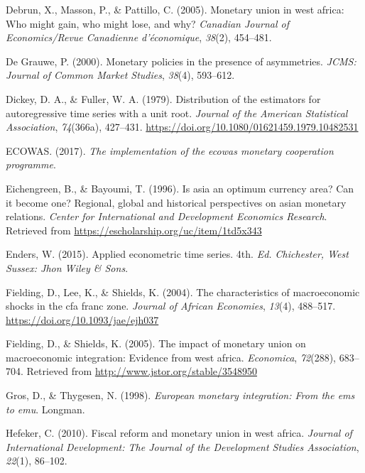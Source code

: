 \documentclass[]{article}
\begin{document}
\leavevmode\hypertarget{ref-debrun2005monetary}{}%
Debrun, X., Masson, P., \& Pattillo, C. (2005). Monetary union in west africa: Who might gain, who might lose, and why? \emph{Canadian Journal of Economics/Revue Canadienne d'économique}, \emph{38}(2), 454--481.

\leavevmode\hypertarget{ref-de2000monetary}{}%
De Grauwe, P. (2000). Monetary policies in the presence of asymmetries. \emph{JCMS: Journal of Common Market Studies}, \emph{38}(4), 593--612.

\leavevmode\hypertarget{ref-Dickey1979}{}%
Dickey, D. A., \& Fuller, W. A. (1979). Distribution of the estimators for autoregressive time series with a unit root. \emph{Journal of the American Statistical Association}, \emph{74}(366a), 427--431. \url{https://doi.org/10.1080/01621459.1979.10482531}

\leavevmode\hypertarget{ref-ECOWAS2017}{}%
ECOWAS. (2017). \emph{The implementation of the ecowas monetary cooperation programme}.

\leavevmode\hypertarget{ref-eichengreen1996asia}{}%
Eichengreen, B., \& Bayoumi, T. (1996). Is asia an optimum currency area? Can it become one? Regional, global and historical perspectives on asian monetary relations. \emph{Center for International and Development Economics Research}. Retrieved from \url{https://escholarship.org/uc/item/1td5x343}

\leavevmode\hypertarget{ref-enders2015applied}{}%
Enders, W. (2015). Applied econometric time series. 4th. \emph{Ed. Chichester, West Sussex: Jhon Wiley \& Sons}.

\leavevmode\hypertarget{ref-Fielding2004}{}%
Fielding, D., Lee, K., \& Shields, K. (2004). The characteristics of macroeconomic shocks in the cfa franc zone. \emph{Journal of African Economies}, \emph{13}(4), 488--517. \url{https://doi.org/10.1093/jae/ejh037}

\leavevmode\hypertarget{ref-Fielding2005}{}%
Fielding, D., \& Shields, K. (2005). The impact of monetary union on macroeconomic integration: Evidence from west africa. \emph{Economica}, \emph{72}(288), 683--704. Retrieved from \url{http://www.jstor.org/stable/3548950}

\leavevmode\hypertarget{ref-gros1998european}{}%
Gros, D., \& Thygesen, N. (1998). \emph{European monetary integration: From the ems to emu}. Longman.

\leavevmode\hypertarget{ref-hefeker2010fiscal}{}%
Hefeker, C. (2010). Fiscal reform and monetary union in west africa. \emph{Journal of International Development: The Journal of the Development Studies Association}, \emph{22}(1), 86--102.
\end{document}

